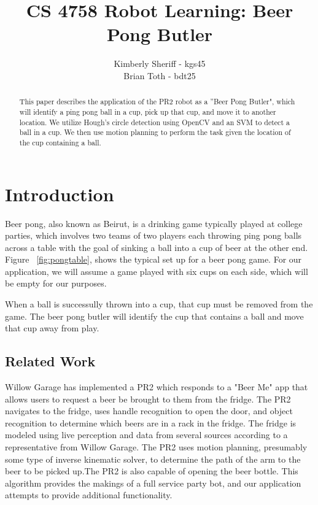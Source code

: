 \documentclass[letterpaper, 10 pt, conference]{ieeeconf}  %
\title{\LARGE \bf
CS 4758 Robot Learning: Beer Pong Butler
}
\author{Kimberly Sheriff - kgs45\\Brian Toth - bdt25}
\begin{document}
\maketitle
\thispagestyle{empty}
\pagestyle{empty}


\begin{abstract}

This paper describes the application of the PR2 robot as a ''Beer Pong Butler", which will identify a ping pong ball in a cup, pick up that cup, and move it to another location. We utilize Hough’s circle detection using OpenCV and an SVM to detect a ball in a cup. We then use motion planning to perform the task given the location of the cup containing a ball.

\end{abstract}


\section{Introduction}

Beer pong, also known as Beirut, is a drinking game typically played at college parties, which involves two teams of two players each throwing ping pong balls across a table with the goal of sinking a ball into a cup of beer at the other end. Figure ~\ref{fig:pongtable}, shows the typical set up for a beer pong game. For our application, we will assume a game played with six cups on each side, which will be empty for our purposes. 

When a ball is successully thrown into a cup, that cup must be removed from the game. The beer pong butler will identify the cup that contains a ball and move that cup away from play.


\subsection{Related Work}

Willow Garage has implemented a PR2 which responds to a "Beer Me" app that allows users to request a beer be brought to them from the fridge. The PR2 navigates to the fridge, uses handle recognition to open the door, and object recognition to determine which beers are in a rack in the fridge. The fridge is modeled using live perception and data from several sources according to a representative from Willow Garage. The PR2  uses motion planning, presumably some type of inverse kinematic solver, to determine the path of the arm to the beer to be picked up.The PR2 is also capable of opening the beer bottle. This algorithm provides the makings of a full service party bot, and our application attempts to provide additional functionality.  
\end{document}
